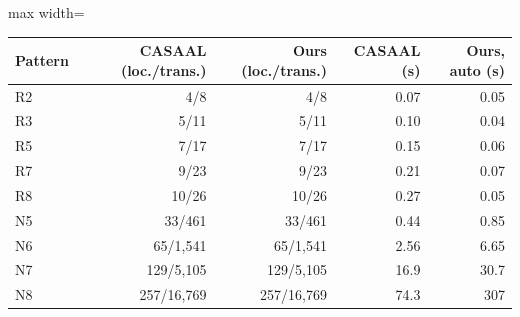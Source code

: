 \begin{adjustbox}{max width=\textwidth}\begin{tabular}{@{}lrrrr@{}}
\toprule
Pattern & CASAAL (loc./trans.) & Ours (loc./trans.) & CASAAL (s) & Ours, auto (s) \\
\midrule
R2 & 4/8 & 4/8 & 0.07 & 0.05 \\
R3 & 5/11 & 5/11 & 0.10 & 0.04 \\
R5 & 7/17 & 7/17 & 0.15 & 0.06 \\
R7 & 9/23 & 9/23 & 0.21 & 0.07 \\
R8 & 10/26 & 10/26 & 0.27 & 0.05 \\
N5 & 33/461 & 33/461 & 0.44 & 0.85 \\
N6 & 65/1{,}541 & 65/1{,}541 & 2.56 & 6.65 \\
N7 & 129/5{,}105 & 129/5{,}105 & 16.9 & 30.7 \\
N8 & 257/16{,}769 & 257/16{,}769 & 74.3 & 307 \\
\bottomrule
\end{tabular}\end{adjustbox}
